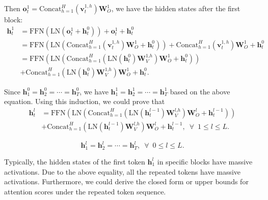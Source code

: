 \documentclass{article} \usepackage{iclr2025_conference,times}
\begin{document}
Then $\boldsymbol{o}_t^1=\textrm{Concat}_{h=1}^H(\boldsymbol{v}_t^{1\textrm{,}\,h})\boldsymbol{W}_O^1$, we have the hidden states after the first block:
\begin{align}
    \boldsymbol{h}_t^1&=\textrm{FFN}(\textrm{LN}(\boldsymbol{o}_t^1+\boldsymbol{h}_t^0))+\boldsymbol{o}_t^1+\boldsymbol{h}_t^0\\
    &=\textrm{FFN}(\textrm{LN}(\textrm{Concat}_{h=1}^H(\boldsymbol{v}_t^{1\textrm{,}\,h})\boldsymbol{W}_O^1+\boldsymbol{h}_t^0))+\textrm{Concat}_{h=1}^H(\boldsymbol{v}_t^{1\textrm{,}\,h})\boldsymbol{W}_O^1+\boldsymbol{h}_t^0\\
    &=\textrm{FFN}(\textrm{LN}(\textrm{Concat}_{h=1}^H(\textrm{LN}(\boldsymbol{h}_t^{0})\boldsymbol{W}_{V}^{1\textrm{,}h})\boldsymbol{W}_O^1+\boldsymbol{h}_t^0))\\
    &+\textrm{Concat}_{h=1}^H(\textrm{LN}(\boldsymbol{h}_t^{0})\boldsymbol{W}_{V}^{1\textrm{,}h})\boldsymbol{W}_O^1+\boldsymbol{h}_t^0\textrm{.}
\end{align}

Since $\boldsymbol{h}_1^0=\boldsymbol{h}_2^0=\cdots=\boldsymbol{h}_T^0$, we have $\boldsymbol{h}_1^1=\boldsymbol{h}_2^1=\cdots=\boldsymbol{h}_T^1$ based on the above equation.  Using this induction, we could prove that
\begin{align}
    \boldsymbol{h}_t^l&=\textrm{FFN}(\textrm{LN}(\textrm{Concat}_{h=1}^H(\textrm{LN}(\boldsymbol{h}_t^{l-1})\boldsymbol{W}_{V}^{l\textrm{,}h})\boldsymbol{W}_O^l+\boldsymbol{h}_t^{l-1}))\\
    &+\textrm{Concat}_{h=1}^H(\textrm{LN}(\boldsymbol{h}_t^{l-1})\boldsymbol{W}_{V}^{l\textrm{,}h})\boldsymbol{W}_O^l+\boldsymbol{h}_t^{l-1}\textrm{,}\,\,\,\,\forall\,\,\, 1\leq l\leq L\textrm{.}
\end{align}

\begin{equation}
\boldsymbol{h}_1^l=\boldsymbol{h}_2^l=\cdots=\boldsymbol{h}_T^l\textrm{,}\,\,\,\,\forall\,\,\, 0\leq l\leq L\textrm{.}
\end{equation}

Typically, the hidden states of the first token $\boldsymbol{h}_1^l$ in specific blocks have massive activations. Due to the above equality, all the repeated tokens have massive activations. Furthermore, we could derive the closed form or upper bounds for attention scores under the repeated token sequence. 
\end{document}
